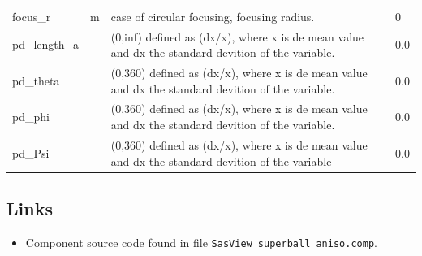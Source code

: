 \begin{longtable}{p{}p{}p{}p{}}
focus\_r & m & case of circular focusing, focusing radius. & 0 \\
pd\_length\_a &  & (0,inf) defined as (dx/x), where x is de mean value and dx the standard devition of the variable. & 0.0 \\
pd\_theta &  & (0,360) defined as (dx/x), where x is de mean value and dx the standard devition of the variable. & 0.0 \\
pd\_phi &  & (0,360) defined as (dx/x), where x is de mean value and dx the standard devition of the variable. & 0.0 \\
pd\_Psi &  & (0,360) defined as (dx/x), where x is de mean value and dx the standard devition of the variable & 0.0 \\
\bottomrule
\end{longtable}

\subsection*{Links}
\begin{itemize}
  \item Component source code found in file \texttt{SasView\_superball\_aniso.comp}.
\end{itemize}
